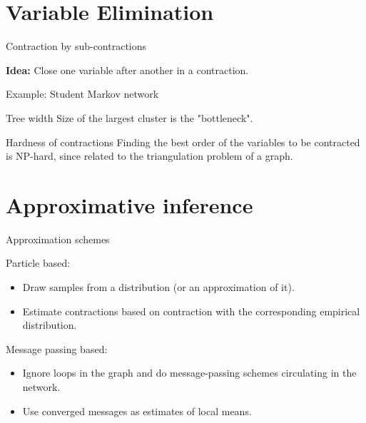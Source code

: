 \documentclass{beamer}
\begin{document}
    {\frame[plain]{\titlepage}}
    \showoutlineatsection


    \section{Variable Elimination}

    \begin{frame}{Contraction by sub-contractions}
        \par
        {\bf Idea:} Close one variable after another in a contraction.

    \end{frame}


    \begin{frame}{Example: Student Markov network}

        

    \end{frame}


    \begin{frame}{Tree width}
        Size of the largest cluster is the "bottleneck".
    \end{frame}

    \begin{frame}{Hardness of contractions}
        Finding the best order of the variables to be contracted is $\mathrm{NP}$-hard, since related to the triangulation problem of a graph.
    \end{frame}


    \section{Approximative inference}

    \begin{frame}{Approximation schemes}

        Particle based:
        \begin{itemize}
            \item Draw samples from a distribution (or an approximation of it).
            \item Estimate contractions based on contraction with the corresponding empirical distribution.
        \end{itemize}

        Message passing based:
        \begin{itemize}
            \item Ignore loops in the graph and do message-passing schemes circulating in the network.
            \item Use converged messages as estimates of local means.
        \end{itemize}


    \end{frame}
\end{document}
